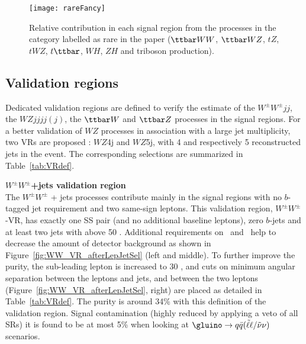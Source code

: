 \begin{figure}[htb]
\centering
\texttt{[image: rareFancy]}
\caption{Relative contribution in each signal region from the processes in the category labelled as rare in the paper ($\ttbar WW$, 
$\ttbar WZ$, $tZ$, $tWZ$, $t\ttbar$, $WH$, $ZH$ and triboson production). }
\label{fig:RareBreakdown} 
\end{figure} 

\subsection{Validation regions}
\label{sec:bkg.irred.def}

Dedicated validation regions are defined to verify the estimate
of the $W^\pm W^\pm jj$, the $WZjjjj(j)$, the $\ttbar W$ and $\ttbar Z$ 
processes in the signal regions. 
For a better validation of $WZ$ processes in association with a large jet 
multiplicity, two VRs are proposed : $WZ$4j and $WZ$5j, with 4 and
respectively 5 reconstructed jets in the event.
The corresponding selections are summarized in Table~\ref{tab:VRdef}.

\par{\bf $W^\pm W^\pm$+jets validation region\\}
The $W^{\pm}W^{\pm}$ + jets processes contribute mainly in the signal regions with no $b$-tagged jet requirement and two same-sign leptons. This validation region, $W^\pm W^{\pm}$-VR, has exactly one SS pair (and no additional baseline leptons), zero $b$-jets and at least two jets with \pt above 50 \GeV. Additional requirements on \met\ and \meff\ help to decrease the amount of detector background as shown in Figure~\ref{fig:WW_VR_afterLepJetSel} (left and middle). To further improve the purity, the sub-leading lepton \pt is increased to 30 \GeV, and cuts on minimum angular separation between the leptons and jets, and between the two leptons (Figure~\ref{fig:WW_VR_afterLepJetSel}, right) are placed as detailed in Table~\ref{tab:VRdef}. The purity is around 34\% with this definition 
of the validation region. Signal contamination (highly reduced by applying a veto of all SRs) it is found to be at most 5\% when looking at $\gluino \rightarrow q\bar q (\tilde \ell \ell / \tilde \nu \nu)$ scenarios.

